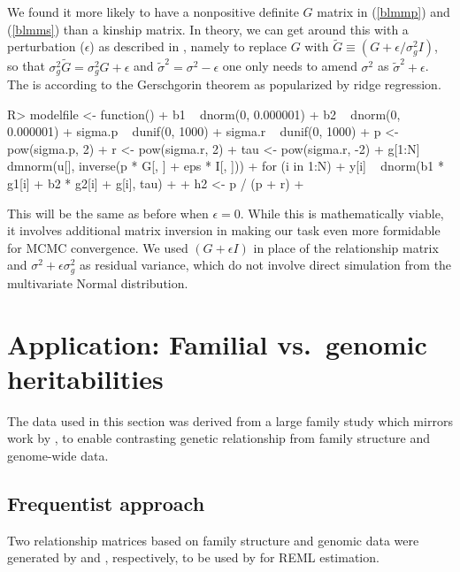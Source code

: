 \documentclass[article]{jss}
\begin{document}
We found it more likely to have a nonpositive definite $G$ matrix in
(\ref{blmmp}) and (\ref{blmms}) than a kinship matrix. In theory, we
can get around this with a perturbation ($\epsilon$) as described in
\citet[p.~174]{guo91}, namely to replace $G$ with
$\tilde G\equiv(G+\epsilon/\sigma_g^2I)$, so that
$\sigma_g^2\tilde G=\sigma_g^2G+\epsilon$ and
$\tilde\sigma^2=\sigma^2-\epsilon$ one only needs to amend $\sigma^2$
as $\tilde\sigma^2 + \epsilon$. The is according to the Gerschgorin
theorem \citep[Theorem 1.4]{varga04} as popularized by ridge
regression.
%
\begin{Schunk}
\begin{Sinput}
R> modelfile <- function() {
+    b1 ~ dnorm(0, 0.000001)
+    b2 ~ dnorm(0, 0.000001)
+    sigma.p ~ dunif(0, 1000)
+    sigma.r ~ dunif(0, 1000)
+    p <- pow(sigma.p, 2)
+    r <- pow(sigma.r, 2)
+    tau <- pow(sigma.r, -2)
+    g[1:N] ~ dmnorm(u[], inverse(p * G[, ] + eps * I[, ]))
+    for (i in 1:N) {
+      y[i] ~ dnorm(b1 * g1[i] + b2 * g2[i] + g[i], tau)
+    }
+    h2 <- p / (p + r)
+  }
\end{Sinput}
\end{Schunk}
%
This will be the same as before when $\epsilon=0$. While this is   
mathematically viable, it involves additional matrix inversion in
 making our task even more formidable for MCMC convergence.
We used $(G+\epsilon I)$ in place of the relationship matrix and 
$\sigma^2+\epsilon\sigma_g^2$ as residual variance, which do not
involve direct simulation from the multivariate Normal distribution.

\section[Application: Familial vs. genomic heritabilities]{Application: Familial vs.~genomic heritabilities}\label{fgh}

The data used in this section was derived from a large family study which
mirrors work by \citep{klimentdis13}, to enable contrasting genetic relationship
from family structure and genome-wide data.

\newpage
\subsection{Frequentist approach}\label{fgh:freq}
Two relationship matrices based on family structure and genomic data
were generated by  and , respectively, to be used
by  for REML estimation.
\end{document}
